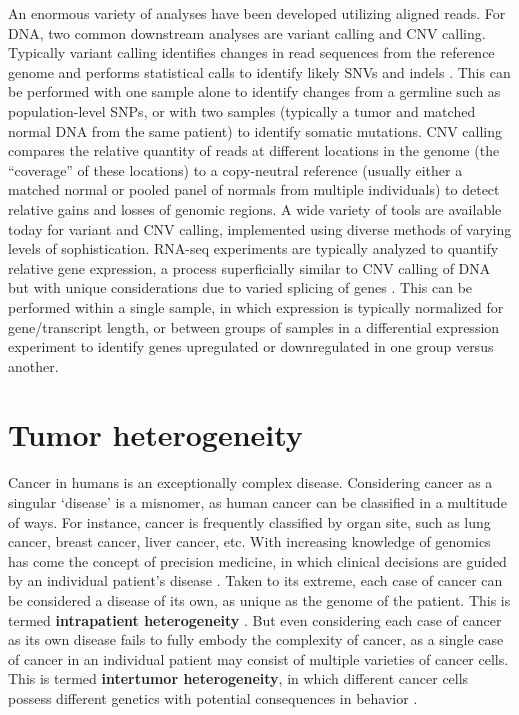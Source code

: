 An enormous variety of analyses have been developed utilizing aligned reads. For DNA, two common downstream analyses are variant calling and CNV calling. Typically variant calling identifies changes in read sequences from the reference genome and performs statistical calls to identify likely SNVs and indels \cite{pirooznia2014}. This can be performed with one sample alone to identify changes from a germline such as population-level SNPs, or with two samples (typically a tumor and matched normal DNA from the same patient) to identify somatic mutations. CNV calling compares the relative quantity of reads at different locations in the genome (the ``coverage'' of these locations) to a copy-neutral reference (usually either a matched normal or pooled panel of normals from multiple individuals) to detect relative gains and losses of genomic regions. A wide variety of tools are available today for variant and CNV calling, implemented using diverse methods of varying levels of sophistication. RNA-seq experiments are typically analyzed to quantify relative gene expression, a process superficially similar to CNV calling of DNA but with unique considerations due to varied splicing of genes \cite{conesa2016}. This can be performed within a single sample, in which expression is typically normalized for gene/transcript length, or between groups of samples in a differential expression experiment to identify genes upregulated or downregulated in one group versus another.

\section{Tumor heterogeneity}
Cancer in humans is an exceptionally complex disease. Considering cancer as a singular `disease' is a misnomer, as human cancer can be classified in a multitude of ways. For instance, cancer is frequently classified by organ site, such as lung cancer, breast cancer, liver cancer, etc. With increasing knowledge of genomics has come the concept of precision medicine, in which clinical decisions are guided by an individual patient's disease \cite{pauli2017}. Taken to its extreme, each case of cancer can be considered a disease of its own, as unique as the genome of the patient. This is termed \textbf{intrapatient heterogeneity} \cite{menzies2014}. But even considering each case of cancer as its own disease fails to fully embody the complexity of cancer, as a single case of cancer in an individual patient may consist of multiple varieties of cancer cells. This is termed \textbf{intertumor heterogeneity}, in which different cancer cells possess different genetics with potential consequences in behavior \cite{marusyk2010}.

